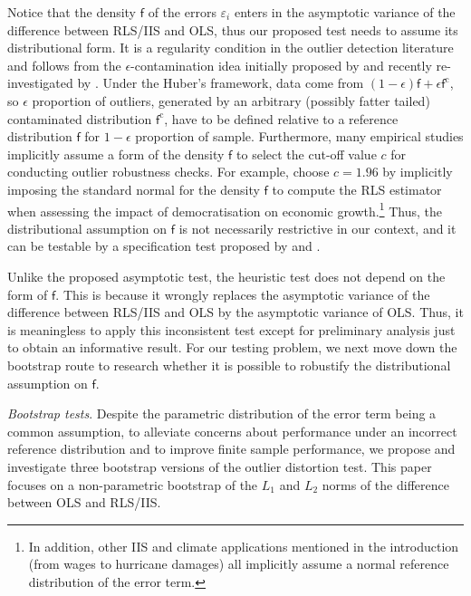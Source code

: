 \documentclass[11pt, letterpaper]{article}
\numberwithin{algorithm}{section}
\numberwithin{assumption}{section}
\numberwithin{lemma}{section}
\numberwithin{theorem}{section}
\numberwithin{corollary}{section}
\numberwithin{remark}{section}
\numberwithin{equation}{section}
\numberwithin{figure}{section}
\numberwithin{table}{section}
\begin{document}
Notice that the density $\mathsf{f}$ of the errors $\varepsilon_{i}$ enters in the asymptotic variance of the difference between RLS/IIS and OLS, thus our proposed test needs to assume its distributional form. It is a regularity condition in the outlier detection literature and follows from the $\epsilon$-contamination idea initially proposed by \cite{huber1964robust} and recently re-investigated by \cite{johansen2016analysis}. Under the Huber's framework, data come from $(1 - \epsilon) \mathsf{f} + \epsilon \mathsf{f}^{\mathrm{c}}$, so $\epsilon$ proportion of outliers, generated by an arbitrary (possibly fatter tailed) contaminated distribution $\mathsf{f}^{\mathrm{c}}$, have to be defined relative to a reference distribution $\mathsf{f}$ for $1 - \epsilon$ proportion of sample. Furthermore, many empirical studies implicitly assume a form of the density $\mathsf{f}$ to select the cut-off value $c$ for conducting outlier robustness checks. For example, \cite{acemoglu2019democracy} choose $c = 1.96$ by implicitly imposing the standard normal for the density $\mathsf{f}$ to compute the RLS estimator when assessing the impact of democratisation on economic growth.\footnote{In addition, other IIS and climate applications mentioned in the introduction (from wages to hurricane damages) all implicitly assume a normal reference distribution of the error term.} Thus, the distributional assumption on $\mathsf{f}$ is not necessarily restrictive in our context, and it can be testable by a specification test proposed by \cite{berenguer2018marked} and \cite{jiao2018testing}.

Unlike the proposed asymptotic test, the heuristic test does not depend on the form of $\mathsf{f}$. This is because it wrongly replaces the asymptotic variance of the difference between RLS/IIS and OLS by the asymptotic variance of OLS. Thus, it is meaningless to apply this inconsistent test except for preliminary analysis just to obtain an informative result. For our testing problem, we next move down the bootstrap route to research whether it is possible to robustify the distributional assumption on $\mathsf{f}$.

\emph{Bootstrap tests}. Despite the parametric distribution of the error term being a common assumption, to alleviate concerns about performance under an incorrect reference distribution and to improve finite sample performance, we propose and investigate three bootstrap versions of the outlier distortion test. This paper focuses on a non-parametric bootstrap of the $L_{1}$ and $L_{2}$ norms of the difference between OLS and RLS/IIS.
\end{document}

